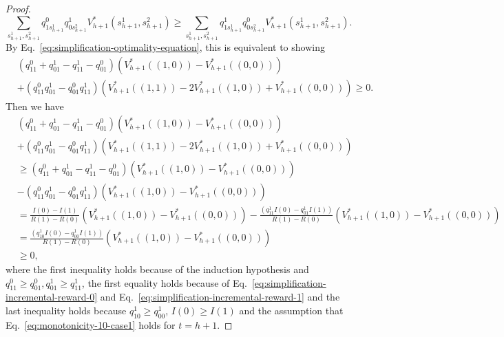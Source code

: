 \begin{proof}
\begin{equation}
    \sum_{s_{h+1}^1,s_{h+1}^2}q^0_{1s_{h+1}^1}q^1_{0s_{h+1}^2}V_{h+1}^*\left(s_{h+1}^1,s_{h+1}^2\right)\geq   \sum_{s_{h+1}^1,s_{h+1}^2}q^1_{1s_{h+1}^1}q^0_{0s_{h+1}^2}V_{h+1}^*\left(s_{h+1}^1,s_{h+1}^2\right).\label{eq:equation-showing-optimality}
    \end{equation}
By Eq.~\eqref{eq:simplification-optimality-equation}, this is equivalent to showing
\begin{align*}
    &\left(q^0_{11}+q^1_{01}-q^1_{11}-q^0_{01}\right)\left(V_{h+1}^*\left((1,0)\right)-V_{h+1}^*\left((0,0)\right)\right)\\&+\left(q^0_{11}q^1_{01}-q^0_{01}q^1_{11}\right)\left(V_{h+1}^*\left((1,1)\right)-2V_{h+1}^*\left((1,0)\right)+V_{h+1}^*\left((0,0)\right)\right)\geq 0.
\end{align*}
Then we have
\begin{align*}
    &\left(q^0_{11}+q^1_{01}-q^1_{11}-q^0_{01}\right)\left(V_{h+1}^*\left((1,0)\right)-V_{h+1}^*\left((0,0)\right)\right)\\&+\left(q^0_{11}q^1_{01}-q^0_{01}q^1_{11}\right)\left(V_{h+1}^*\left((1,1)\right)-2V_{h+1}^*\left((1,0)\right)+V_{h+1}^*\left((0,0)\right)\right)\\
    &\geq \left(q^0_{11}+q^1_{01}-q^1_{11}-q^0_{01}\right)\left(V_{h+1}^*\left((1,0)\right)-V_{h+1}^*\left((0,0)\right)\right)\\
    &-\left(q^0_{11}q^1_{01}-q^0_{01}q^1_{11}\right)\left(V_{h+1}^*\left((1,0)\right)-V_{h+1}^*\left((0,0)\right)\right)\\
    &=\frac{I(0)-I(1)}{R(1)-R(0)}\left(V_{h+1}^*\left((1,0)\right)-V_{h+1}^*\left((0,0)\right)\right)-\frac{\left(q^1_{11}I(0)-q^1_{01}I(1)\right)}{R(1)-R(0)}\left(V_{h+1}^*\left((1,0)\right)-V_{h+1}^*\left((0,0)\right)\right)\\
    &=\frac{\left(q^1_{10}I(0)-q^1_{00}I(1)\right)}{R(1)-R(0)}\left(V_{h+1}^*\left((1,0)\right)-V_{h+1}^*\left((0,0)\right)\right)\\
    &\geq 0,
\end{align*}
where the first inequality holds because of the induction hypothesis and $q^0_{11}\geq q^0_{01},q^1_{01}\geq q^1_{11}$, the first equality holds because of Eq.~\eqref{eq:simplification-incremental-reward-0} and Eq.~\eqref{eq:simplification-incremental-reward-1} and the last inequality holds because $q^1_{10}\geq q^1_{00}$, $I(0)\geq I(1)$ and the assumption that Eq.~\eqref{eq:monotonicity-10-case1} holds for $t=h+1$. 


\end{proof}
